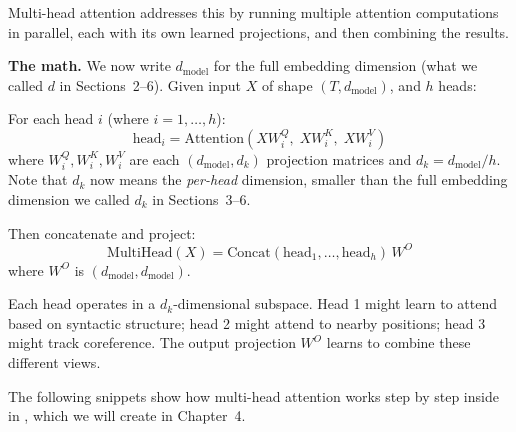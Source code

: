 Multi-head attention addresses this by running multiple attention computations in parallel, each with its own learned projections, and then combining the results.

\textbf{The math.} We now write $d_{\text{model}}$ for the full embedding dimension (what we called $d$ in Sections~2--6). Given input $X$ of shape $(T, d_{\text{model}})$, and $h$ heads:

For each head $i$ (where $i = 1, \ldots, h$):
\[
\text{head}_i = \mathrm{Attention}(X W_i^Q,\; X W_i^K,\; X W_i^V)
\]
where $W_i^Q, W_i^K, W_i^V$ are each $(d_{\text{model}}, d_k)$ projection matrices and $d_k = d_{\text{model}} / h$. Note that $d_k$ now means the \emph{per-head} dimension, smaller than the full embedding dimension we called $d_k$ in Sections~3--6.

Then concatenate and project:
\[
\mathrm{MultiHead}(X) = \mathrm{Concat}(\text{head}_1, \ldots, \text{head}_h)\, W^O
\]
where $W^O$ is $(d_{\text{model}}, d_{\text{model}})$.

Each head operates in a $d_k$-dimensional subspace. Head 1 might learn to attend based on syntactic structure; head 2 might attend to nearby positions; head 3 might track coreference. The output projection $W^O$ learns to combine these different views.

The following snippets show how multi-head attention works step by step inside  in , which we will create in Chapter~4.

